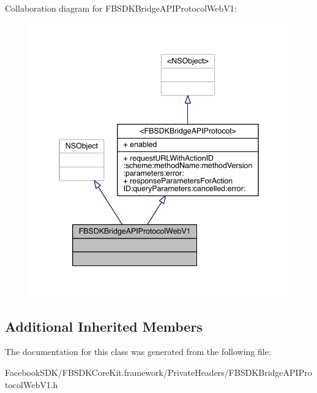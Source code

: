 Collaboration diagram for F\-B\-S\-D\-K\-Bridge\-A\-P\-I\-Protocol\-Web\-V1\-:
\nopagebreak
\begin{figure}[H]
\begin{center}
\leavevmode
\includegraphics[width=342pt]{interface_f_b_s_d_k_bridge_a_p_i_protocol_web_v1__coll__graph}
\end{center}
\end{figure}
\subsection*{Additional Inherited Members}


The documentation for this class was generated from the following file\-:\begin{DoxyCompactItemize}
\item 
Facebook\-S\-D\-K/\-F\-B\-S\-D\-K\-Core\-Kit.\-framework/\-Private\-Headers/F\-B\-S\-D\-K\-Bridge\-A\-P\-I\-Protocol\-Web\-V1.\-h\end{DoxyCompactItemize}
